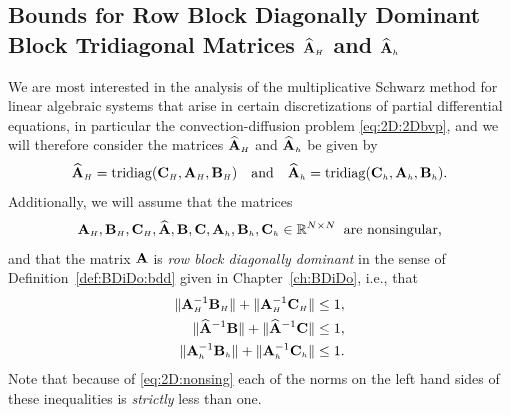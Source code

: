 \subsection{Bounds for Row Block Diagonally Dominant Block Tridiagonal Matrices $\matAHhat$ and $\matAhhat$}
\label{2D:bounds:row}
We are most interested in the analysis of the multiplicative Schwarz method for
linear algebraic systems that arise in certain discretizations of partial
differential equations, in particular the convection-diffusion problem
\eqref{eq:2D:2Dbvp}, and we will  therefore consider the matrices $\matAHhat$ and $\matAhhat$ be given by
%
\begin{equation}\label{eq:2D:tridiag}
\matAHhat=\mathrm{tridiag}(\matCH,\matAH,\matBH)
\quad\text{and}\quad
\matAhhat=\mathrm{tridiag}(\matCh,\matAh,\matBh).
\end{equation}
%
Additionally, we will assume that the matrices
%
\begin{equation}\label{eq:2D:nonsing}
\matAH,\matBH,\matCH,\matA,\matB,\matC,\matAh,\matBh,\matCh \in
\mathbb{R}^{N\times N}
\;\;\mbox{are nonsingular,}
\end{equation}
%
and that the matrix $\A$ is {\em row block diagonally dominant} in the
sense of Definition~\ref{def:BDiDo:bdd} given in Chapter~\ref{ch:BDiDo}, i.e.,
that
%
\begin{align}
 \|\matAH^{-1}\matBH\|+\|\matAH^{-1}\matCH\| &\leq 1,\nonumber\\
 \|\matA^{-1}\B\|+\|\matA^{-1}\C\| &\leq 1,\label{eq:2D:dominant}\\
 \|\matAh^{-1}\matBh\|+\|\matAh^{-1}\matCh\| &\leq 1.\nonumber
\end{align}
%
Note that because of \eqref{eq:2D:nonsing} each of the norms on the left hand
sides of these inequalities is \emph{strictly} less than one.

